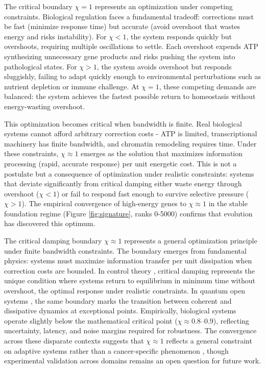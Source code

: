 \documentclass[11pt,letterpaper]{article}
\begin{document}
The critical boundary $\chi = 1$ represents an optimization under competing constraints. Biological regulation faces a fundamental tradeoff: corrections must be fast (minimize response time) but accurate (avoid overshoot that wastes energy and risks instability). For $\chi < 1$, the system responds quickly but overshoots, requiring multiple oscillations to settle. Each overshoot expends ATP synthesizing unnecessary gene products and risks pushing the system into pathological states. For $\chi > 1$, the system avoids overshoot but responds sluggishly, failing to adapt quickly enough to environmental perturbations such as nutrient depletion or immune challenge. At $\chi = 1$, these competing demands are balanced: the system achieves the fastest possible return to homeostasis without energy-wasting overshoot.

This optimization becomes critical when bandwidth is finite. Real biological systems cannot afford arbitrary correction costs - ATP is limited, transcriptional machinery has finite bandwidth, and chromatin remodeling requires time. Under these constraints, $\chi \approx 1$ emerges as the solution that maximizes information processing (rapid, accurate response) per unit energetic cost. This is not a postulate but a consequence of optimization under realistic constraints: systems that deviate significantly from critical damping either waste energy through overshoot ($\chi < 1$) or fail to respond fast enough to survive selective pressure ($\chi > 1$). The empirical convergence of high-energy genes to $\chi \approx 1$ in the stable foundation regime (Figure \ref{fig:signature}, ranks 0-5000) confirms that evolution has discovered this optimum.

The critical damping boundary $\chi \approx 1$ represents a general optimization principle under finite bandwidth constraints. The boundary emerges from fundamental physics: systems must maximize information transfer per unit dissipation when correction costs are bounded. In control theory \cite{Ogata2010,Astrom2008}, critical damping represents the unique condition where systems return to equilibrium in minimum time without overshoot, the optimal response under realistic constraints. In quantum open systems \cite{Lindblad1976}, the same boundary marks the transition between coherent and dissipative dynamics at exceptional points. Empirically, biological systems operate slightly below the mathematical critical point ($\chi \approx 0.8$--$0.9$), reflecting uncertainty, latency, and noise margins required for robustness. The convergence across these disparate contexts suggests that $\chi \approx 1$ reflects a general constraint on adaptive systems rather than a cancer-specific phenomenon \cite{Munoz2018,Mora2011}, though experimental validation across domains remains an open question for future work.
\end{document}

